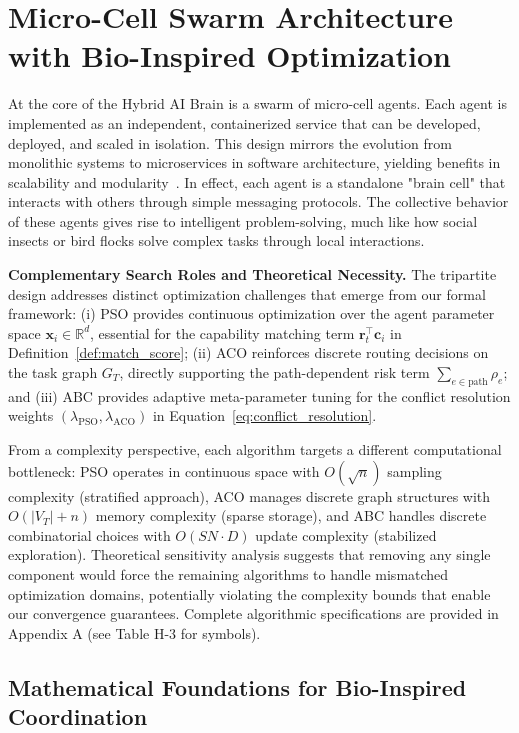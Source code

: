 \documentclass{article}
\begin{document}
\section{Micro-Cell Swarm Architecture with Bio-Inspired Optimization}
\label{sec:micro_cell_swarm}

At the core of the Hybrid AI Brain is a swarm of micro-cell agents. Each agent is implemented as an independent, containerized service that can be developed, deployed, and scaled in isolation. This design mirrors the evolution from monolithic systems to microservices in software architecture, yielding benefits in scalability and modularity~\cite{newman2015building}. In effect, each agent is a standalone "brain cell" that interacts with others through simple messaging protocols. The collective behavior of these agents gives rise to intelligent problem-solving, much like how social insects or bird flocks solve complex tasks through local interactions.

\textbf{Complementary Search Roles and Theoretical Necessity.} The tripartite design addresses distinct optimization challenges that emerge from our formal framework: (i) PSO provides continuous optimization over the agent parameter space $\mathbf{x}_i \in \mathbb{R}^d$, essential for the capability matching term $\mathbf{r}_t^\top \mathbf{c}_i$ in Definition~\ref{def:match_score}; (ii) ACO reinforces discrete routing decisions on the task graph $G_T$, directly supporting the path-dependent risk term $\sum_{e \in \text{path}} \rho_e$; and (iii) ABC provides adaptive meta-parameter tuning for the conflict resolution weights $(\lambda_{\text{PSO}}, \lambda_{\text{ACO}})$ in Equation~\ref{eq:conflict_resolution}.

From a complexity perspective, each algorithm targets a different computational bottleneck: PSO operates in continuous space with $O(\sqrt{n})$ sampling complexity (stratified approach), ACO manages discrete graph structures with $O(|V_T| + n)$ memory complexity (sparse storage), and ABC handles discrete combinatorial choices with $O(SN \cdot D)$ update complexity (stabilized exploration). Theoretical sensitivity analysis suggests that removing any single component would force the remaining algorithms to handle mismatched optimization domains, potentially violating the complexity bounds that enable our convergence guarantees. Complete algorithmic specifications are provided in Appendix A (see Table H-3 for symbols).

\subsection{Mathematical Foundations for Bio-Inspired Coordination}
\label{subsec:bio_coordination_foundations}
\end{document}

